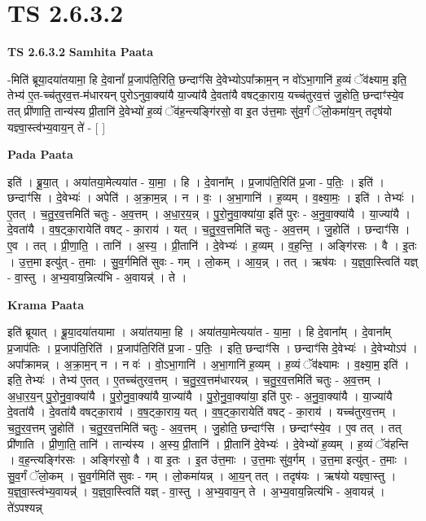 \documentclass[17pt]{extarticle}
\begin{document}
\section{ TS 2.6.3.2 }

\textbf{TS 2.6.3.2 } \newline
\textbf{Samhita Paata} \newline

-मिति॑ ब्रूया॒दया॑तयामा॒ हि दे॒वानां᳚ प्र॒जाप॑ति॒रिति॒ छन्दाꣳ॑सि दे॒वेभ्योऽपा᳚क्राम॒न् न वो॑ऽभा॒गानि॑ ह॒व्यं ॅव॑क्ष्याम॒ इति॒ तेभ्य॑ ए॒त-च्च॑तुरव॒त्त-म॑धारयन् पुरोऽनुवा॒क्या॑यै या॒ज्या॑यै दे॒वता॑यै वषट्का॒राय॒ यच्च॑तुरव॒त्तं जु॒होति॒ छन्दाꣳ॑स्ये॒व तत् प्री॑णाति॒ तान्य॑स्य प्री॒तानि॑ दे॒वेभ्यो॑ ह॒व्यं ॅव॑ह॒न्त्यङ्गि॑रसो॒ वा इ॒त उ॑त्त॒माः सु॑व॒र्गं ॅलो॒कमा॑य॒न् तदृष॑यो यज्ञ्वा॒स्त्व॑भ्य॒वाय॒न् ते॑ - [  ] \newline

\textbf{Pada Paata} \newline

इति॑ । ब्रू॒या॒त् । अया॑तया॒मेत्यया॑त - या॒मा॒ । हि । दे॒वाना᳚म् । प्र॒जाप॑ति॒रिति॑ प्र॒जा - प॒तिः॒ । इति॑ । छन्दाꣳ॑सि । दे॒वेभ्यः॑ । अपेति॑ । अ॒क्रा॒म॒न्न् । न । वः॒ । अ॒भा॒गानि॑ । ह॒व्यम् । व॒क्ष्या॒मः॒ । इति॑ । तेभ्यः॑ । ए॒तत् । च॒तु॒र॒व॒त्तमिति॑ चतुः - अ॒व॒त्तम् । अ॒धा॒र॒य॒न्न् । पु॒रो॒नु॒वा॒क्या॑या॒ इति॑ पुरः - अ॒नु॒वा॒क्या॑यै । या॒ज्या॑यै । दे॒वता॑यै । व॒ष॒ट्का॒रायेति॑ वषट् - का॒राय॑ । यत् । च॒तु॒र॒व॒त्तमिति॑ चतुः - अ॒व॒त्तम् । जु॒होति॑ । छन्दाꣳ॑सि । ए॒व । तत् । प्री॒णा॒ति॒ । तानि॑ । अ॒स्य॒ । प्री॒तानि॑ । दे॒वेभ्यः॑ । ह॒व्यम् । व॒ह॒न्ति॒ । अङ्गि॑रसः । वै । इ॒तः । उ॒त्त॒मा इत्यु॑त् - त॒माः । सु॒व॒र्गमिति॑ सुवः - गम् । लो॒कम् । आ॒य॒न्न् । तत् । ऋष॑यः । य॒ज्ञ्॒वा॒स्त्विति॑ यज्ञ् - वा॒स्तु । अ॒भ्य॒वाय॒न्नित्य॑भि - अ॒वायन्न्॑ । ते ।  \newline


\textbf{Krama Paata} \newline

इति॑ ब्रूयात् । ब्रू॒या॒दया॑तयामा । अया॑तयामा॒ हि । अया॑तया॒मेत्यया॑त - या॒मा॒ । हि दे॒वाना᳚म् । दे॒वाना᳚म् प्र॒जाप॑तिः । प्र॒जाप॑ति॒रिति॑ । प्र॒जाप॑ति॒रिति॑ प्र॒जा - प॒तिः॒ । इति॒ छन्दाꣳ॑सि । छन्दाꣳ॑सि दे॒वेभ्यः॑ । दे॒वेभ्योऽप॑ । अपा᳚क्रामन्न् । अ॒क्रा॒म॒न् न । न वः॑ । वो॒ऽभा॒गानि॑ । अ॒भा॒गानि॑ ह॒व्यम् । ह॒व्यं ॅव॑क्ष्यामः । व॒क्ष्या॒म॒ इति॑ । इति॒ तेभ्यः॑ । तेभ्य॑ ए॒तत् । ए॒तच्च॑तुरव॒त्तम् । च॒तु॒र॒व॒त्तम॑धारयन्न् । च॒तु॒र॒व॒त्तमिति॑ चतुः - अ॒व॒त्तम् । अ॒धा॒र॒य॒न् पु॒रो॒नु॒वा॒क्या॑यै । पु॒रो॒नु॒वा॒क्या॑यै या॒ज्या॑यै । पु॒रो॒नु॒वा॒क्या॑या॒ इति॑ पुरः - अ॒नु॒वा॒क्या॑यै । या॒ज्या॑यै दे॒वता॑यै । दे॒वता॑यै वषट्का॒राय॑ । व॒ष॒ट्का॒राय॒ यत् । व॒ष॒ट्का॒रायेति॑ वषट् - का॒राय॑ । यच्च॑तुरव॒त्तम् । च॒तु॒र॒व॒त्तम् जु॒होति॑ । च॒तु॒र॒व॒त्तमिति॑ चतुः - अ॒व॒त्तम् । जु॒होति॒ छन्दाꣳ॑सि । छन्दाꣳ॑स्ये॒व । ए॒व तत् । तत् प्री॑णाति । प्री॒णा॒ति॒ तानि॑ । तान्य॑स्य । अ॒स्य॒ प्री॒तानि॑ । प्री॒तानि॑ दे॒वेभ्यः॑ । दे॒वेभ्यो॑ ह॒व्यम् । ह॒व्यं ॅव॑हन्ति । व॒ह॒न्त्यङ्गि॑रसः । अङ्गि॑रसो॒ वै । वा इ॒तः । इ॒त उ॑त्त॒माः । उ॒त्त॒माः सु॑व॒र्गम् । उ॒त्त॒मा इत्यु॑त् - त॒माः । सु॒व॒र्गं ॅलो॒कम् । सु॒व॒र्गमिति॑ सुवः - गम् । लो॒कमा॑यन्न् । आ॒य॒न् तत् । तदृष॑यः । ऋष॑यो यज्ञ्वा॒स्तु । य॒ज्ञ्॒वा॒स्त्व॑भ्य॒वायन्न्॑ । य॒ज्ञ्॒वा॒स्त्विति॑ यज्ञ् - वा॒स्तु । अ॒भ्य॒वाय॒न् ते । अ॒भ्य॒वाय॒न्नित्य॑भि - अ॒वायन्न्॑ । ते॑ऽपश्यन्न् \newline
\end{document}
